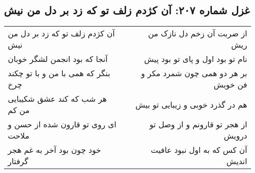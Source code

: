 \begin{center}
\section*{غزل شماره ۲۰۷: آن کژدم زلف تو که زد بر دل من نیش}
\label{sec:207}
\begin{longtable}{l p{0.5cm} r}
آن کژدم زلف تو که زد بر دل من نیش
&&
از ضربت آن زخم دل نازک من ریش
\\
آنجا که بود انجمن لشگر خوبان
&&
نام تو بود اول و پای تو بود پیش
\\
بنگر که همی با من و با تو چکند چرخ
&&
بر هر دو همی چون شمرد مکر و فن خویش
\\
هر شب که کند عشق شکیبایی من کم
&&
هم در گذرد خوبی و زیبایی تو بیش
\\
ای روی تو قارون شده از حسن و ملاحت
&&
از هجر تو قارونم و از وصل تو درویش
\\
خود چون بود آخر به غم هجر گرفتار
&&
آن کس که به اول نبود عافیت اندیش
\\
\end{longtable}
\end{center}
